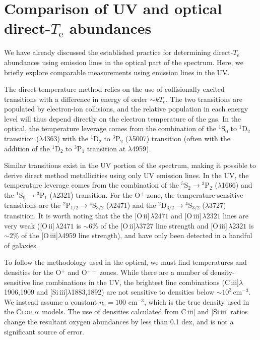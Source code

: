 \documentclass[preprint2]{aastex62}
\newcommand{\Cloudy}{\textsc{Cloudy}\xspace}
\newcommand{\oiii}{[O\,{\sc iii}]\xspace}
\newcommand{\oii}{[O\,{\sc ii}]\xspace}
\newcommand{\SiuIII}{[Si\,{\sc iii}]\xspace}
\newcommand{\ciii}{C\,{\sc iii}]\xspace}
\newcommand{\Te}{\ensuremath{T_{\mathrm{e}}}\xspace}
\begin{document}


\appendix

\section{Comparison of UV and optical direct-\Te abundances}\label{appdx:UVdirectTe}

We have already discussed the established practice for determining direct-\Te abundances using emission lines in the optical part of the spectrum. Here, we briefly explore comparable measurements using emission lines in the UV.

The direct-temperature method relies on the use of collisionally excited transitions with a difference in energy of order ${\sim}k T_{e}$. The two transitions are populated by electron-ion collisions, and the relative population in each energy level will thus depend directly on the electron temperature of the gas. In the optical, the temperature leverage comes from the combination of the ${}^1 \mathrm{S}_0$ to ${}^1 \mathrm{D}_2$ transition ($\lambda$4363) with the  ${}^1 \mathrm{D}_2$ to ${}^3 \mathrm{P}_2$ ($\lambda$5007) transition (often with the addition of the ${}^1\mathrm{D}_2$ to $^3\mathrm{P}_1$ transition at $\lambda$4959).

Similar transitions exist in the UV portion of the spectrum, making it possible to derive direct method metallicities using only UV emission lines. In the UV, the temperature leverage comes from the combination of the ${}^5 \mathrm{S}_2 \rightarrow {}^3 \mathrm{P}_2$ ($\lambda$1666) and the ${}^1 \mathrm{S}_0 \rightarrow {}^3 \mathrm{P}_1$ ($\lambda$2321) transition. For the O$^{+}$ zone, the temperature-sensitive transitions are the ${}^2 \mathrm{P}_{1/2} \rightarrow {}^4 \mathrm{S}_{3/2}$ ($\lambda$2471) and the ${}^2 \mathrm{D}_{3/2} \rightarrow {}^4 \mathrm{S}_{3/2}$ ($\lambda$3727) transition. It is worth noting that the the \oii$\,\lambda2471$ and \oiii$\,\lambda2321$ lines are very weak (\oii$\,\lambda2471$ is ${\sim}6$\% of the \oii$\lambda$3727 line strength and \oiii$\,\lambda2321$ is ${\sim}2$\% of the \oiii$\lambda$4959 line strength), and have only been detected in a handful of galaxies.

To follow the methodology used in the optical, we must find temperatures and densities for the O$^{+}$ and O$^{++}$ zones. While there are a number of density-sensitive line combinations in the UV, the brightest line combinations (\ciii$\lambda$1906,1909 and \SiuIII$\lambda$1883,1892) are not sensitive to densities below $\sim10^3\,$cm$^{-3}$. We instead assume a constant $n_{\mathrm{e}} = 100$ cm$^{-3}$, which is the true density used in the \Cloudy models. The use of densities calculated from \ciii and \SiuIII ratios change the resultant oxygen abundances by less than 0.1 dex, and is not a significant source of error.
\end{document}
